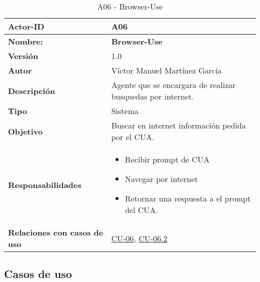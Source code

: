 \begin{table}[H]
	\centering
	\begin{tabularx}{\linewidth}{ p{} p{} }
		\toprule
		\textbf{Actor-ID}    & A06 \\
		\toprule
		\textbf{Nombre: } 			  & \textbf{Browser-Use} \\
		\textbf{Versión}              & 1.0    \\
		\textbf{Autor}                & Víctor Manuel Martínez García \\
		\textbf{Descripción}          & Agente que se encargara de realizar busquedas por internet.\\
		\textbf{Tipo}                 & Sistema \\
		\textbf{Objetivo}             & Buscar en internet información pedida por el CUA. \\
		\textbf{Responsabilidades}    & 
		\begin{itemize}
			\tightlist
			\item Recibir prompt de CUA
            \item Navegar por internet
            \item Retornar una respuesta a el prompt del CUA.
		\end{itemize}\\
		\textbf{Relaciones con casos de uso} & \hyperref[CU-06 Buscar Informacion de internet]{CU-06}, \hyperref[CU-06.2 Realizar navegacion y recuperacion de datos]{CU-06.2}\\
		\bottomrule
	\end{tabularx}
	\caption{A06 - Browser-Use}
	\label{actor:Browser-Use}
\end{table}

\subsection{Casos de uso}

